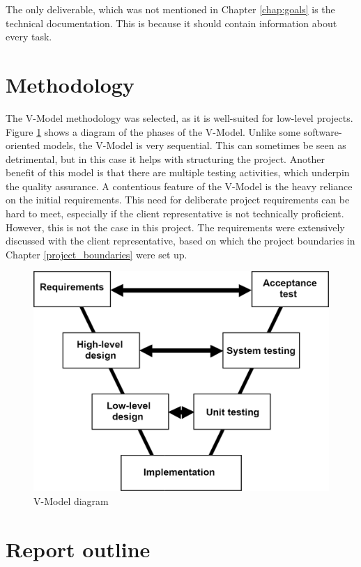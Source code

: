 The only deliverable, which was not mentioned in Chapter \ref{chap:goals} is the technical documentation. This is because it should contain information about every task.

\section{Methodology}\label{methodological_approach}
The V-Model methodology was selected, as it is well-suited for low-level projects. Figure \ref{fig:vmodel} shows a diagram of the phases of the V-Model. Unlike some software-oriented models, the V-Model is very sequential. This can sometimes be seen as detrimental, but in this case it helps with structuring the project. Another benefit of this model is that there are multiple testing activities, which underpin the quality assurance. A contentious feature of the V-Model is the heavy reliance on the initial requirements. This need for deliberate project requirements can be hard to meet, especially if the client representative is not technically proficient. However, this is not the case in this project. The requirements were extensively discussed with the client representative, based on which the project boundaries in Chapter \ref{project_boundaries} were set up.

\begin{figure}[ht]
	\centering
	\includegraphics[width=0.7\linewidth]{img/vmodel}
	\caption{V-Model diagram}
	\label{fig:vmodel}
\end{figure}


\section{Report outline}

